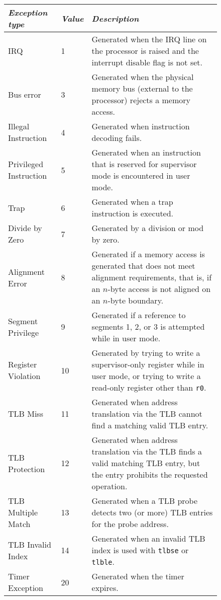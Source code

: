 \begin{figure}[hpt]
\begin{center}
\begin{tabular} {|l|l|p{4.0in}|}
\hline
{\em Exception type}	& {\em Value}	& {\em Description} \\
\hline
IRQ      		& 1    & Generated when the IRQ line on
				the processor is raised and the interrupt
				disable flag is not set. \\
\hline
Bus error       	& 3	 & Generated when the
				physical memory bus (external to the processor)
				rejects a memory access. \\
\hline
Illegal Instruction     & 4	& Generated when instruction decoding fails. \\
\hline
Privileged Instruction  & 5	& Generated when an instruction that 
				is reserved for supervisor mode is
				encountered in user mode. \\
\hline
Trap 			& 6     & Generated when a trap instruction is executed.
				\\
\hline
Divide by Zero		& 7	& Generated by a division or mod by zero. \\
\hline
Alignment Error		& 8	& Generated if a memory
				access is generated that does not meet alignment
				requirements, that is, if an $n$-byte access is 
				not aligned on an $n$-byte boundary. \\
\hline
Segment Privilege	& 9	& Generated if a reference to segments 1,
				2, or 3 is attempted while in
				user mode. \\
\hline
Register Violation	& 10	& Generated by
				trying to write a supervisor-only
				register while in user mode,
				or trying to write a read-only
				register other than {\tt r0}. \\
\hline
TLB Miss        	& 11	& Generated when address
				translation via the TLB cannot find a matching
				valid TLB entry. \\
\hline
TLB Protection		& 12	& Generated when address translation via the TLB
				finds a valid matching TLB entry, but the
				entry prohibits the requested operation.
				\\
\hline
TLB Multiple Match	& 13	& Generated when a TLB probe detects two (or more)
				TLB entries for the probe address.\\
\hline
TLB Invalid Index	& 14	& Generated when an invalid TLB index is
				used with {\tt tlbse} or {\tt tlble}. \\
\hline
Timer Exception		& 20	& Generated when the timer expires. \\
\hline
\end{tabular}
\end{center}
\end{figure}

